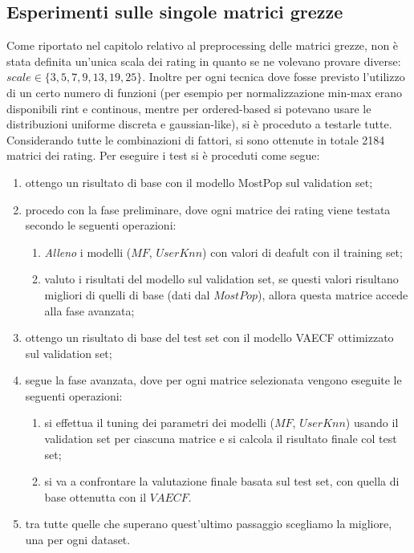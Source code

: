 \subsection{Esperimenti sulle singole matrici grezze}
Come riportato nel capitolo relativo al preprocessing delle matrici grezze, non è stata definita un'unica scala dei rating in quanto se ne volevano provare diverse: $scale \in \{3, 5, 7, 9, 13, 19, 25\}$.
Inoltre per ogni tecnica dove fosse previsto l'utilizzo di un certo numero di funzioni (per esempio per normalizzazione min-max erano disponibili rint e continous, mentre per ordered-based si potevano usare le distribuzioni uniforme discreta e gaussian-like), si è proceduto a testarle tutte.
Considerando tutte le combinazioni di fattori, si sono ottenute in totale 2184 matrici dei rating.
Per eseguire i test si è proceduti come segue:
\begin{enumerate}
    \item ottengo un risultato di base con il modello MostPop sul validation set;
    \item procedo con la fase preliminare, dove ogni matrice dei rating viene testata secondo le seguenti operazioni:
    \begin{enumerate}
        \item \textit{Alleno} i modelli ($MF$, $UserKnn$) con valori di deafult con il training set;
        \item valuto i risultati del modello sul validation set, se questi valori risultano migliori di quelli di base (dati dal $MostPop$), allora questa matrice accede alla fase avanzata;
    \end{enumerate}
    \item ottengo un risultato di base del test set con il modello VAECF ottimizzato sul validation set;
    \item segue la fase avanzata, dove per ogni matrice selezionata vengono eseguite le seguenti operazioni:
    \begin{enumerate}
        \item si effettua il tuning dei parametri dei modelli ($MF$, $UserKnn$) usando il validation set per ciascuna matrice e si calcola il risultato finale col test set;
        \item si va a confrontare la valutazione finale basata sul test set, con quella di base ottenutta con il $VAECF$.
    \end{enumerate}
    \item tra tutte quelle che superano quest'ultimo passaggio scegliamo la migliore, una per ogni dataset.
\end{enumerate}

